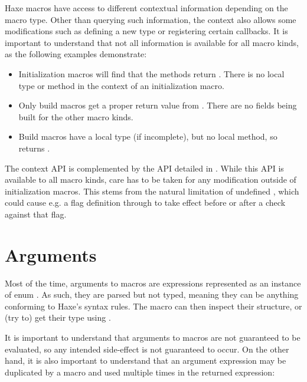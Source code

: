 \documentclass{haxe}
\begin{document}
Haxe macros have access to different contextual information depending on the macro type. Other than querying such information, the context also allows some modifications such as defining a new type or registering certain callbacks. It is important to understand that not all information is available for all macro kinds, as the following examples demonstrate:

\begin{itemize}
	\item Initialization macros will find that the  methods return . There is no local type or method in the context of an initialization macro.
	\item Only build macros get a proper return value from . There are no fields being built for the other macro kinds.
	\item Build macros have a local type (if incomplete), but no local method, so  returns .
\end{itemize}

The context API is complemented by the  API detailed in . While this API is available to all macro kinds, care has to be taken for any modification outside of initialization macros. This stems from the natural limitation of undefined , which could cause e.g. a flag definition through  to take effect before or after a  check against that flag.

\section{Arguments}
\label{macro-arguments}

Most of the time, arguments to macros are expressions represented as an instance of enum . As such, they are parsed but not typed, meaning they can be anything conforming to Haxe's syntax rules. The macro can then inspect their structure, or (try to) get their type using .

It is important to understand that arguments to macros are not guaranteed to be evaluated, so any intended side-effect is not guaranteed to occur. On the other hand, it is also important to understand that an argument expression may be duplicated by a macro and used multiple times in the returned expression:
\end{document}
